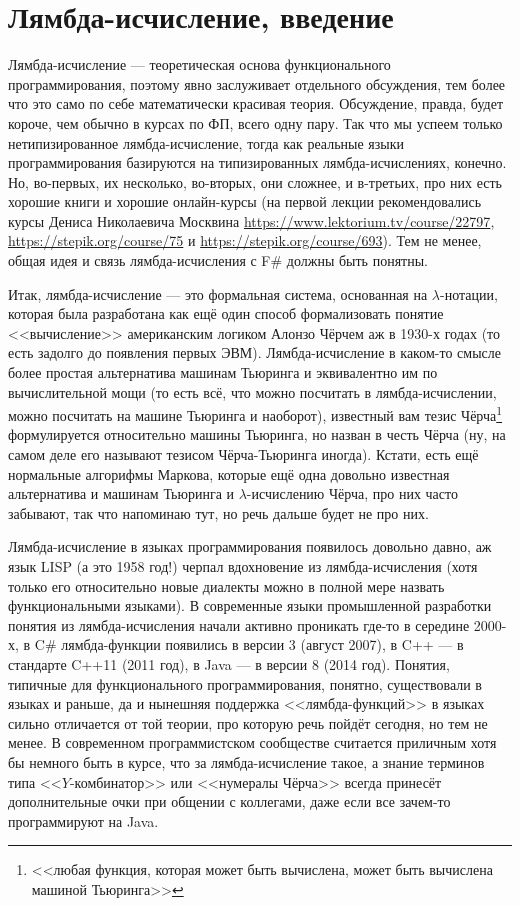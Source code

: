 \documentclass{../../text-style}
\begin{document}
\maketitle
\thispagestyle{empty}

\section{Лямбда-исчисление, введение}

Лямбда-исчисление --- теоретическая основа функционального программирования, поэтому явно заслуживает отдельного обсуждения, тем более что это само по себе математически красивая теория. Обсуждение, правда, будет короче, чем обычно в курсах по ФП, всего одну пару. Так что мы успеем только нетипизированное лямбда-исчисление, тогда как реальные языки программирования базируются на типизированных лямбда-исчислениях, конечно. Но, во-первых, их несколько, во-вторых, они сложнее, и в-третьих, про них есть хорошие книги и хорошие онлайн-курсы (на первой лекции рекомендовались курсы Дениса Николаевича Москвина \url{https://www.lektorium.tv/course/22797}, \url{https://stepik.org/course/75} и \url{https://stepik.org/course/693}). Тем не менее, общая идея и связь лямбда-исчисления с F\# должны быть понятны.

Итак, лямбда-исчисление --- это формальная система, основанная на $\lambda$-нотации, которая была разработана как ещё один способ формализовать понятие <<вычисление>> американским логиком Алонзо Чёрчем аж в 1930-х годах (то есть задолго до появления первых ЭВМ). Лямбда-исчисление в каком-то смысле более простая альтернатива машинам Тьюринга и эквивалентно им по вычислительной мощи (то есть всё, что можно посчитать в лямбда-исчислении, можно посчитать на машине Тьюринга и наоборот), известный вам тезис Чёрча\footnote{<<любая функция, которая может быть вычислена, может быть вычислена машиной Тьюринга>>} формулируется относительно машины Тьюринга, но назван в честь Чёрча (ну, на самом деле его называют тезисом Чёрча-Тьюринга иногда). Кстати, есть ещё нормальные алгорифмы Маркова, которые ещё одна довольно известная альтернатива и машинам Тьюринга и $\lambda$-исчислению Чёрча, про них часто забывают, так что напоминаю тут, но речь дальше будет не про них.

Лямбда-исчисление в языках программирования появилось довольно давно, аж язык LISP (а это 1958 год!) черпал вдохновение из лямбда-исчисления (хотя только его относительно новые диалекты можно в полной мере назвать функциональными языками). В современные языки промышленной разработки понятия из лямбда-исчисления начали активно проникать где-то в середине 2000-х, в C\# лямбда-функции появились в версии 3 (август 2007), в C++ --- в стандарте C++11 (2011 год), в Java --- в версии 8 (2014 год). Понятия, типичные для функционального программирования, понятно, существовали в языках и раньше, да и нынешняя поддержка <<лямбда-функций>> в языках сильно отличается от той теории, про которую речь пойдёт сегодня, но тем не менее. В современном программистском сообществе считается приличным хотя бы немного быть в курсе, что за лямбда-исчисление такое, а знание терминов типа <<$Y$-комбинатор>> или <<нумералы Чёрча>> всегда принесёт дополнительные очки при общении с коллегами, даже если все зачем-то программируют на Java.
\end{document}
